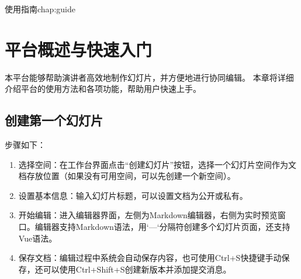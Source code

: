 \begin{cuzchapter}{使用指南}{chap:guide}


    \section{平台概述与快速入门}\label{sec:overview-quickstart}

    本平台能够帮助演讲者高效地制作幻灯片，并方便地进行协同编辑。
    本章将详细介绍平台的使用方法和各项功能，帮助用户快速上手。

    \subsection{创建第一个幻灯片}

    步骤如下：
    \begin{enumerate}
        \item 选择空间：在工作台界面点击“创建幻灯片”按钮，选择一个幻灯片空间作为文档存放位置（如果没有可用空间，可以先创建一个新空间）。
        \item 设置基本信息：输入幻灯片标题，可以设置文档为公开或私有。
        \item 开始编辑：进入编辑器界面，左侧为Markdown编辑器，右侧为实时预览窗口。编辑器支持Markdown语法，用`---`分隔符创建多个幻灯片页面，还支持Vue语法。
        \item 保存文档：编辑过程中系统会自动保存内容，也可使用Ctrl+S快捷键手动保存，还可以使用Ctrl+Shift+S创建新版本并添加提交消息。
    \end{enumerate}


\end{cuzchapter}
